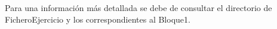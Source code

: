 



Para una información más detallada se debe de consultar el directorio de FicheroEjercicio y los correspondientes al Bloque1.




